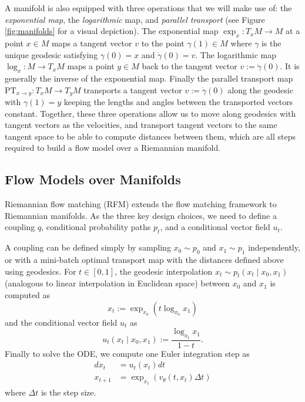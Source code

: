 A manifold is also equipped with three operations that we will make use of: the \textit{exponential map}, the \textit{logarithmic} map, and \textit{parallel transport} (see Figure \ref{fig:manifolds} for a visual depiction). The exponential map $\exp_x: T_x M \to M$ at a point $x \in M$ maps a tangent vector $v$ to the point $\gamma(1) \in M$ where $\gamma$ is the unique geodesic satisfying $\gamma(0) = x$ and $\dot \gamma(0) = v$. The logarithmic map $\log_x: M \to T_x M$ maps a point $y \in M$ back to the tangent vector $v := \dot \gamma (0)$. It is generally the inverse of the exponential map. Finally the parallel transport map $\text{PT}_{x \to y}: T_x M \to T_y M$ transports a tangent vector $v := \dot \gamma(0)$ along the geodesic with $\gamma(1) = y$ keeping the lengths and angles between the transported vectors constant. Together, these three operations allow us to move along geodesics with tangent vectors as the velocities, and transport tangent vectors to the same tangent space to be able to compute distances between them, which are all steps required to build a flow model over a Riemannian manifold. 

\subsection{Flow Models over Manifolds}

Riemannian flow matching (RFM) \citep{chenRiemannianFlowMatching2023} extends the flow matching framework to Riemannian manifolds. As the three key design choices, we need to define a coupling $q$, conditional probability paths $p_t$, and a conditional vector field $u_t$. 

A coupling can be defined simply by sampling $x_0 \sim p_0$ and $x_1 \sim p_1$ independently, or with a mini-batch optimal transport map with the distances defined above using geodesics. For $t\in [0,1]$, the geodesic interpolation $x_t \sim p_t(x_t \mid x_0, x_1)$ (analogous to linear interpolation in Euclidean space) between $x_0$ and $x_1$ is computed as 
\begin{equation}
    x_t := \exp_{x_0}(t \log_{x_0} x_1)
\end{equation}
and the conditional vector field $u_t$ as
\begin{equation}
    u_t(x_t \mid x_0, x_1) := \frac{\log_{x_t}x_1}{1 - t}.
\end{equation}
Finally to solve the ODE, we compute one Euler integration step as
\begin{align}
    dx_t &= u_t(x_t)dt \\
    x_{t + 1} &= \exp_{x_t}(v_\theta(t, x_t) \Delta t)
\end{align}
where $\Delta t$ is the step size. 


